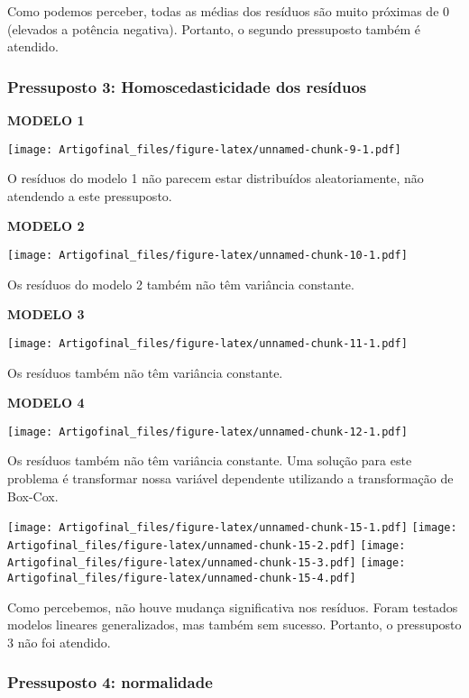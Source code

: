 \documentclass[]{article}
\begin{document}
Como podemos perceber, todas as médias dos resíduos são muito próximas
de 0 (elevados a potência negativa). Portanto, o segundo pressuposto
também é atendido.

\newpage

\subsubsection{Pressuposto 3: Homoscedasticidade dos
resíduos}\label{pressuposto-3-homoscedasticidade-dos-residuos}

\textbf{MODELO 1}

\texttt{[image: Artigofinal\_files/figure-latex/unnamed-chunk-9-1.pdf]}

O resíduos do modelo 1 não parecem estar distribuídos aleatoriamente,
não atendendo a este pressuposto.

\newpage

\textbf{MODELO 2}

\texttt{[image: Artigofinal\_files/figure-latex/unnamed-chunk-10-1.pdf]}

Os resíduos do modelo 2 também não têm variância constante.

\newpage

\textbf{MODELO 3}

\texttt{[image: Artigofinal\_files/figure-latex/unnamed-chunk-11-1.pdf]}

Os resíduos também não têm variância constante.

\newpage

\textbf{MODELO 4}

\texttt{[image: Artigofinal\_files/figure-latex/unnamed-chunk-12-1.pdf]}

Os resíduos também não têm variância constante. Uma solução para este
problema é transformar nossa variável dependente utilizando a
transformação de Box-Cox.

\texttt{[image: Artigofinal\_files/figure-latex/unnamed-chunk-15-1.pdf]}
\texttt{[image: Artigofinal\_files/figure-latex/unnamed-chunk-15-2.pdf]}
\texttt{[image: Artigofinal\_files/figure-latex/unnamed-chunk-15-3.pdf]}
\texttt{[image: Artigofinal\_files/figure-latex/unnamed-chunk-15-4.pdf]}

Como percebemos, não houve mudança significativa nos resíduos. Foram
testados modelos lineares generalizados, mas também sem sucesso.
Portanto, o pressuposto 3 não foi atendido.

\subsubsection{Pressuposto 4:
normalidade}\label{pressuposto-4-normalidade}
\end{document}
